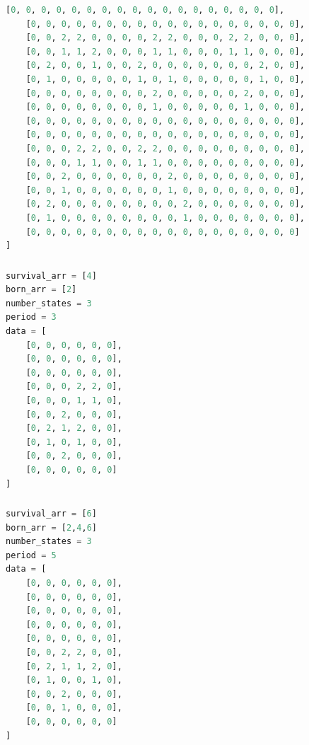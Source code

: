 \documentclass[12pt]{article}
\numberwithin{figure}{section} %
\begin{document}
\begin{lstlisting}[language = Python]
    [0, 0, 0, 0, 0, 0, 0, 0, 0, 0, 0, 0, 0, 0, 0, 0, 0, 0],
    [0, 0, 0, 0, 0, 0, 0, 0, 0, 0, 0, 0, 0, 0, 0, 0, 0, 0],  
    [0, 0, 2, 2, 0, 0, 0, 0, 2, 2, 0, 0, 0, 2, 2, 0, 0, 0],
    [0, 0, 1, 1, 2, 0, 0, 0, 1, 1, 0, 0, 0, 1, 1, 0, 0, 0],
    [0, 2, 0, 0, 1, 0, 0, 2, 0, 0, 0, 0, 0, 0, 0, 2, 0, 0],
    [0, 1, 0, 0, 0, 0, 0, 1, 0, 1, 0, 0, 0, 0, 0, 1, 0, 0],
    [0, 0, 0, 0, 0, 0, 0, 0, 2, 0, 0, 0, 0, 0, 2, 0, 0, 0],
    [0, 0, 0, 0, 0, 0, 0, 0, 1, 0, 0, 0, 0, 0, 1, 0, 0, 0],
    [0, 0, 0, 0, 0, 0, 0, 0, 0, 0, 0, 0, 0, 0, 0, 0, 0, 0],
    [0, 0, 0, 0, 0, 0, 0, 0, 0, 0, 0, 0, 0, 0, 0, 0, 0, 0], 
    [0, 0, 0, 2, 2, 0, 0, 2, 2, 0, 0, 0, 0, 0, 0, 0, 0, 0],
    [0, 0, 0, 1, 1, 0, 0, 1, 1, 0, 0, 0, 0, 0, 0, 0, 0, 0],
    [0, 0, 2, 0, 0, 0, 0, 0, 0, 2, 0, 0, 0, 0, 0, 0, 0, 0],
    [0, 0, 1, 0, 0, 0, 0, 0, 0, 1, 0, 0, 0, 0, 0, 0, 0, 0],
    [0, 2, 0, 0, 0, 0, 0, 0, 0, 0, 2, 0, 0, 0, 0, 0, 0, 0],
    [0, 1, 0, 0, 0, 0, 0, 0, 0, 0, 1, 0, 0, 0, 0, 0, 0, 0],
    [0, 0, 0, 0, 0, 0, 0, 0, 0, 0, 0, 0, 0, 0, 0, 0, 0, 0] 
]
\end{lstlisting}
\noindent\begin{minipage}{.45\textwidth}
\subsubsection{}
\begin{lstlisting}[language = Python]
survival_arr = [4]
born_arr = [2]
number_states = 3
period = 3
data = [
    [0, 0, 0, 0, 0, 0],
    [0, 0, 0, 0, 0, 0],
    [0, 0, 0, 0, 0, 0],
    [0, 0, 0, 2, 2, 0],
    [0, 0, 0, 1, 1, 0],
    [0, 0, 2, 0, 0, 0],
    [0, 2, 1, 2, 0, 0],
    [0, 1, 0, 1, 0, 0],
    [0, 0, 2, 0, 0, 0],
    [0, 0, 0, 0, 0, 0]
]
\end{lstlisting}
\end{minipage}\hfill
\begin{minipage}{.45\textwidth}
\subsubsection{}
\begin{lstlisting}[language = Python]
survival_arr = [6]
born_arr = [2,4,6]
number_states = 3
period = 5
data = [
    [0, 0, 0, 0, 0, 0],
    [0, 0, 0, 0, 0, 0],
    [0, 0, 0, 0, 0, 0],
    [0, 0, 0, 0, 0, 0],
    [0, 0, 0, 0, 0, 0],
    [0, 0, 2, 2, 0, 0], 
    [0, 2, 1, 1, 2, 0], 
    [0, 1, 0, 0, 1, 0], 
    [0, 0, 2, 0, 0, 0], 
    [0, 0, 1, 0, 0, 0], 
    [0, 0, 0, 0, 0, 0]
]
\end{lstlisting}
\end{minipage}
\end{document}
